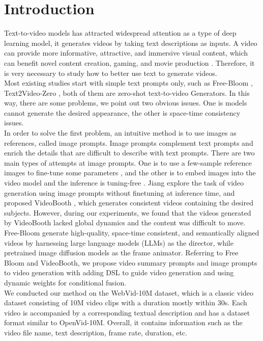 \section{Introduction}
\label{sec:Introduction}

Text-to-video models has attracted widespread attention as a type of deep learning model\cite{blattmann2023align,esser2023structure}, it generates videos by taking text descriptions as inputs. A video can provide more informative, attractive, and immersive visual content, which can benefit novel content creation, gaming, and movie production \cite{he2022latent}. Therefore, it is very necessary to study how to better use text to generate videos.\\
\indent Most existing studies start with simple text prompts only, such as Free-Bloom \cite{huang2024free}, Text2Video-Zero \cite{li2023amt}, both of them are zero-shot text-to-video Generators. In this way, there are some problems, we point out two obvious issues. One is models cannot generate the desired appearance, the other is space-time consistency issues.\\
\indent In order to solve the first problem, an intuitive method is to use images as references, called image prompts. Image prompts complement text prompts and enrich the details that are difficult to describe with text prompts. There are two main types of attempts at image prompts. One is to use a few-sample reference images to fine-tune some parameters \cite{choi2023custom}, and the other is to embed images into the video model and the inference is tuning-free \cite{chen2023disenbooth}. Jiang explore the task of video generation using image prompts without finetuning at inference time, and proposed VideoBooth \cite{jiang2024videobooth}, which generates consistent videos containing the desired subjects. However, during our experiments, we found that the videos generated by VideoBooth lacked global dynamics and the content was difficult to move.\\
\indent Free-Bloom generate high-quality, space-time consistent, and semantically aligned videos by harnessing large language models (LLMs) as the director, while pretrained image diffusion models as the frame animator. Referring to Free Bloom and VideoBooth, we propose video summary prompts and image prompts to video generation with adding DSL to guide video generation and using dynamic weights for conditional fusion.\\
\indent We conducted our method on the WebVid-10M dataset, which is a classic video dataset consisting of 10M video clips with a duration mostly within 30s. Each video is accompanied by a corresponding textual description and has a dataset format similar to OpenVid-10M. Overall, it contains information such as the video file name, text description, frame rate, duration, etc.\\
